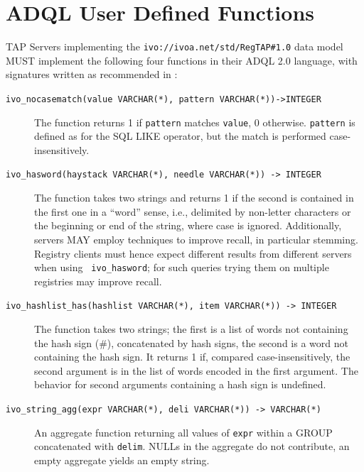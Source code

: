 \documentclass[11pt,a4paper]{ivoa}
\newcommand{\rtent}[1]{\texttt{\color{rtcolor} #1}}
\begin{document}



\section{ADQL User Defined Functions}

\label{adqludf}

TAP Servers implementing the 
\texttt{ivo://ivoa.net/std/RegTAP\#1.0} data model MUST 
implement the following four functions in their ADQL 2.0 language,
with signatures written as recommended in \citep{std:TAPREGEXT}:


\begin{description}
\item[\texttt{ivo\_nocasematch(value VARCHAR(*), pattern VARCHAR(*))->INTEGER}]
The function returns 1 if \texttt{pattern}  matches
\texttt{value}, 0 otherwise.
\texttt{pattern}  is defined as for the SQL LIKE operator, but the
match is performed case-insensitively.

\item[\texttt{ivo\_hasword(haystack VARCHAR(*), needle VARCHAR(*)) -> INTEGER}]The function takes two strings and returns 1 if the second is
contained in the first one in a ``word'' sense, i.e., delimited by
non-letter characters or the beginning or end of the string, where case
is ignored.
Additionally, servers MAY employ techniques to improve recall, in
particular stemming.  Registry clients must hence expect different results
from different servers when using \rtent{ivo\_hasword}; for such
queries trying them on multiple registries may improve recall.
\item[\texttt{ivo\_hashlist\_has(hashlist VARCHAR(*), item VARCHAR(*)) -> INTEGER}]The function takes two strings; the first is a list of words not
containing the hash sign (\#), concatenated by hash signs, the second is
a word not containing the hash sign.  It returns 1 if, compared
case-insensitively, the second argument is in the list of words encoded in
the first argument.  The behavior for second
arguments containing a hash sign is undefined.
\item[\texttt{ivo\_string\_agg(expr VARCHAR(*), deli VARCHAR(*)) -> VARCHAR(*)}]An aggregate function returning all values of
\texttt{expr} within a GROUP concatenated with 
\texttt{delim}.  NULLs in the aggregate do not contribute, an empty 
aggregate yields an empty string.

\end{description}
\end{document}

